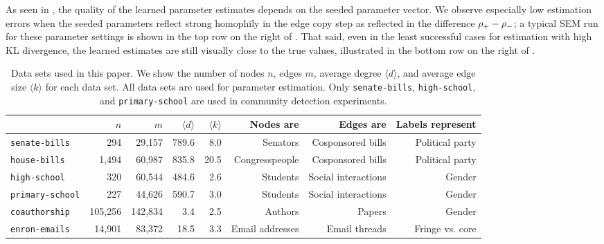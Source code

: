 \documentclass[aps,pre,reprint,superscriptaddress,nofootinbib]{revtex4-2}
\begin{document}
As seen in , the quality of the learned parameter estimates depends on the seeded parameter vector. 
We observe especially low estimation errors when the seeded parameters reflect strong homophily in the edge copy step as reflected in the difference $\rho_+ - \rho_-$; a typical SEM run for these parameter settings is shown in the top row on the right of .
That said, even in the least successful cases for estimation with high KL divergence, the learned estimates are still visually close to the true values, illustrated in the bottom row on the right of . 


\begin{table}
    \caption{Data sets used in this paper. We show the number of nodes $n$, edges $m$, average degree $\langle d \rangle$, and average edge size $\langle k \rangle$ for each data set.
    All data sets are used for parameter estimation. Only \texttt{senate-bills}, \texttt{high-school}, and \texttt{primary-school} are used in community detection experiments.}\label{tab:datasets}
    \begin{tabular}{lrrrrrrr}
        & $n$ & $m$ & $\langle d \rangle$ & $\langle k \rangle$ & Nodes are & Edges are & Labels represent\\
        \midrule
        \texttt{senate-bills} \cite{fowler2006connecting,fowler2006legislative,chodrowGenerativeHypergraphClustering2021} & 294 & 29,157 & 789.6 & 8.0 & Senators & Cosponsored bills & Political party\\
        \texttt{house-bills} \cite{fowler2006connecting,fowler2006legislative,chodrowGenerativeHypergraphClustering2021} &  1,494 & 60,987 & 835.8 & 20.5 & Congresspeople & Cosponsored bills & Political party  \\
        \texttt{high-school} \cite{gemmetto2014mitigation,stehle2011high} & 320 & 60,544 & 484.6 & 2.6 & Students & Social interactions & Gender  \\
        \texttt{primary-school} \cite{mastrandrea2015contact} & 227 & 44,626 & 590.7 & 3.0 & Students & Social interactions & Gender \\
        \texttt{coauthorship} \cite{agarwal2016women} & 105,256 & 142,834 & 3.4 & 2.5 & Authors & Papers & Gender \\
        \texttt{enron-emails} \cite{klimt2004enron}  & 14,901 & 83,372 & 18.5 & 3.3 & Email addresses & Email threads & Fringe vs. core \\
        \bottomrule
    \end{tabular}
\end{table}
\end{document}
